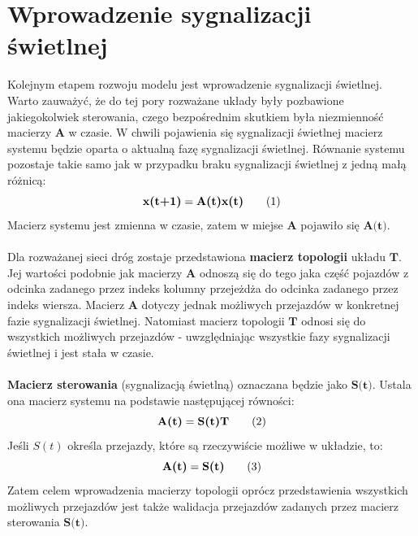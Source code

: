 \documentclass[12pt]{book}
\theoremstyle{plain}
\newcommand\addtag{\refstepcounter{equation}
\renewcommand{\labelenumii}{\theenumii}
\renewcommand{\theenumii}{\theenumi.\arabic{enumii}.}
\tag{\theequation}}
\begin{document}
\newpage
\section{Wprowadzenie sygnalizacji świetlnej}
Kolejnym etapem rozwoju modelu jest wprowadzenie sygnalizacji świetlnej. Warto zauważyć, że do tej pory rozważane układy były pozbawione jakiegokolwiek sterowania, czego bezpośrednim skutkiem była niezmienność macierzy $\textbf{A}$ w czasie. W chwili pojawienia się sygnalizacji świetlnej macierz systemu będzie oparta o aktualną fazę sygnalizacji świetlnej. Równanie systemu pozostaje takie samo jak w przypadku braku sygnalizacji świetlnej z jedną małą różnicą:
\[\textbf{x(t+1)}=\textbf{A(t)x(t)} \addtag \]
Macierz systemu jest zmienna w czasie, zatem w miejse $\textbf{A}$ pojawiło się $\textbf{A(t)}$. \\ \\
Dla rozważanej sieci dróg zostaje przedstawiona \textbf{macierz topologii} układu $\textbf{T}$. Jej wartości podobnie jak macierzy $\textbf{A}$ odnoszą się do tego jaka część pojazdów z odcinka zadanego przez indeks kolumny przejeżdża do odcinka zadanego przez indeks wiersza. Macierz $\textbf{A}$ dotyczy jednak możliwych przejazdów w konkretnej fazie sygnalizacji świetlnej. Natomiast macierz topologii $\textbf{T}$ odnosi się do wszystkich możliwych przejazdów -  uwzględniając wszystkie fazy sygnalizacji świetlnej i jest stała w czasie. \\ \\
\noindent
\textbf{Macierz sterowania} (sygnalizacją świetlną) oznaczana będzie jako $\textbf{S(t)}$. Ustala ona macierz systemu na podstawie następującej równości:
\[\textbf{A(t)}=\textbf{S(t)T} \addtag \]
Jeśli $S(t)$ określa przejazdy, które są rzeczywiście możliwe w układzie, to:
\[\textbf{A(t)}=\textbf{S(t)} \addtag \]
Zatem celem wprowadzenia macierzy topologii oprócz przedstawienia wszystkich możliwych przejazdów jest także walidacja przejazdów zadanych przez macierz sterowania $\textbf{S(t)}$.
\end{document}
